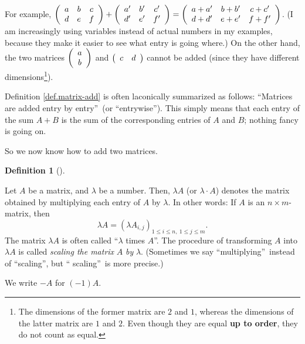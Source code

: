 \documentclass[numbers=enddot,12pt,final,onecolumn,notitlepage]{scrartcl}%
\theoremstyle{definition}
\newtheorem{defi}[theo]{Definition}
\newenvironment{definition}[1][]
{\begin{defi}[#1]\begin{leftbar}}
{\end{leftbar}\end{defi}}
\begin{document}
For example, $\left(
\begin{array}
[c]{ccc}%
a & b & c\\
d & e & f
\end{array}
\right)  +\left(
\begin{array}
[c]{ccc}%
a^{\prime} & b^{\prime} & c^{\prime}\\
d^{\prime} & e^{\prime} & f^{\prime}%
\end{array}
\right)  =\left(
\begin{array}
[c]{ccc}%
a+a^{\prime} & b+b^{\prime} & c+c^{\prime}\\
d+d^{\prime} & e+e^{\prime} & f+f^{\prime}%
\end{array}
\right)  $. (I am increasingly using variables instead of actual numbers in my
examples, because they make it easier to see what entry is going where.) On
the other hand, the two matrices $\left(
\begin{array}
[c]{c}%
a\\
b
\end{array}
\right)  $ and $\left(
\begin{array}
[c]{cc}%
c & d
\end{array}
\right)  $ cannot be added (since they have different dimensions\footnote{The
dimensions of the former matrix are $2$ and $1$, whereas the dimensions of the
latter matrix are $1$ and $2$. Even though they are equal \textbf{up to
order}, they do not count as equal.}).

Definition \ref{def.matrix-add} is often laconically summarized as follows:
\textquotedblleft Matrices are added entry by entry\textquotedblright\ (or
\textquotedblleft entrywise\textquotedblright). This simply means that each
entry of the sum $A+B$ is the sum of the corresponding entries of $A$ and $B$;
nothing fancy is going on.

So we now know how to add two matrices.

\begin{definition}
\label{def.matrix-scale}Let $A$ be a matrix, and $\lambda$ be a number. Then,
$\lambda A$ (or $\lambda\cdot A$) denotes the matrix obtained by multiplying
each entry of $A$ by $\lambda$. In other words: If $A$ is an $n\times
m$-matrix, then%
\[
\lambda A=\left(  \lambda A_{i,j}\right)  _{1\leq i\leq n,\ 1\leq j\leq m}.
\]
The matrix $\lambda A$ is often called \textquotedblleft$\lambda$ times
$A$\textquotedblright. The procedure of transforming $A$ into $\lambda A$ is
called \textit{scaling the matrix }$A$ \textit{by }$\lambda$. (Sometimes we
say \textquotedblleft multiplying\textquotedblright\ instead of
\textquotedblleft scaling\textquotedblright, but \textquotedblleft
scaling\textquotedblright\ is more precise.)

We write $-A$ for $\left(  -1\right)  A$.
\end{definition}
\end{document}
